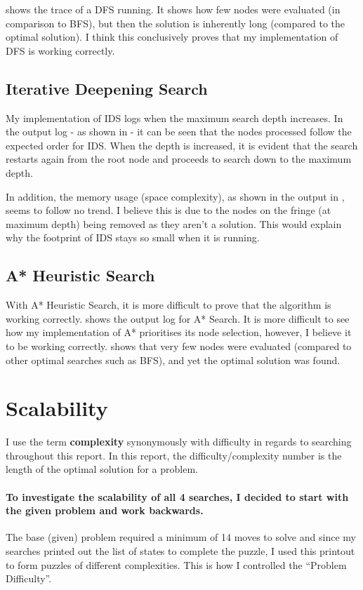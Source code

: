 \documentclass[a4paper]{article}
\begin{document}
 shows the trace of a DFS running.
It shows how few nodes were evaluated (in comparison to BFS), but then the solution is inherently long (compared to the optimal solution).
I think this conclusively proves that my implementation of DFS is working correctly.

\subsection{Iterative Deepening Search}
My implementation of IDS logs when the maximum search depth increases.
In the output log - as shown in  - it can be seen that the nodes processed follow the expected order for IDS.
When the depth is increased, it is evident that the search restarts again from the root node and proceeds to search down to the maximum depth.

In addition, the memory usage (space complexity), as shown in the output in , seems to follow no trend.
I believe this is due to the nodes on the fringe (at maximum depth) being removed as they aren't a solution.
This would explain why the footprint of IDS stays so small when it is running.

\subsection{A* Heuristic Search}
With A* Heuristic Search, it is more difficult to prove that the algorithm is working correctly.
 shows the output log for A* Search.
It is more difficult to see how my implementation of A* prioritises its node selection, however, I believe it to be working correctly.
 shows that very few nodes were evaluated (compared to other optimal searches such as BFS), and yet the optimal solution was found.

\newpage
\section{Scalability}
I use the term \textbf{complexity} synonymously with difficulty in regards to searching throughout this report.
In this report, the difficulty/complexity number is the length of the optimal solution for a problem.

\paragraph{To investigate the scalability of all 4 searches, I decided to start with the given problem and work backwards.}
The base (given) problem required a minimum of 14 moves to solve and since my searches printed out the list of states to complete the puzzle,
I used this printout to form puzzles of different complexities.
This is how I controlled the ``Problem Difficulty''.
\end{document}
